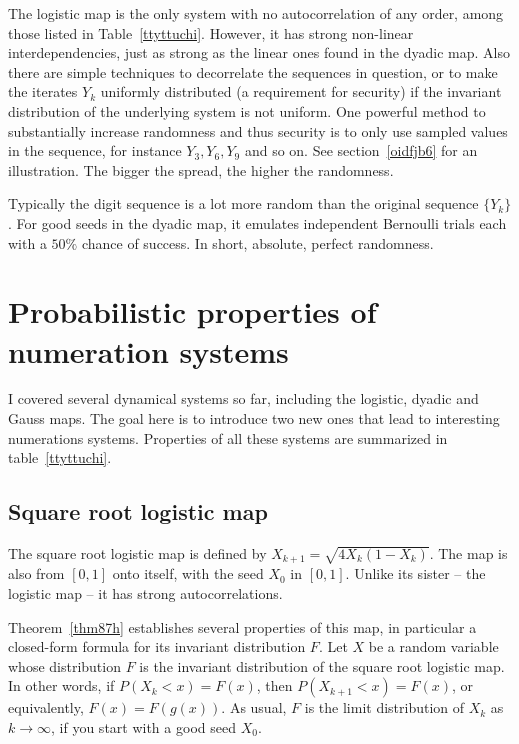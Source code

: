 \documentclass[oneside,10pt]{book}
\begin{document}
The logistic map is the only system with no autocorrelation of any order,  among those listed in Table~\ref{ttyttuchi}. However,
  it has strong non-linear interdependencies, just as strong as the linear ones found in the dyadic map. Also there are simple techniques
 to decorrelate the sequences in question, or to make the iterates $Y_k$ uniformly distributed (a requirement for security) if the invariant
 distribution of the underlying system is not uniform. One powerful method to substantially increase randomness and thus security 
 is to only use sampled values in the sequence, for instance $Y_3, Y_6, Y_9$ and so on. See section~\ref{oidfjb6} for an illustration. The bigger the spread, 
  the higher the randomness. 

Typically the digit sequence is a lot more random than the original sequence $\{Y_k\}$. For good seeds in the dyadic map, 
 it emulates independent Bernoulli trials each with a $50\%$ chance of success. In short, absolute, perfect randomness. 

 



\section{Probabilistic properties of numeration systems}

I covered several dynamical systems so far, including the logistic, dyadic and Gauss maps. The goal here is to introduce two new ones that lead
 to interesting numerations systems. Properties of all these systems are summarized in table~\ref{ttyttuchi}. 


\subsection{Square root logistic map}

The square root logistic map is defined by $X_{k+1}=\sqrt{4X_k(1-X_k)}$. 
The map is also from $[0, 1]$ onto itself, with the seed $X_0$ in $[0, 1]$. Unlike its sister -- the logistic map -- it has strong
 autocorrelations.  

Theorem~\ref{thm87h} establishes several properties of this map, in particular a closed-form formula for its invariant distribution $F$. Let $X$ be a random variable whose distribution $F$ is the invariant distribution of the square root logistic map. In other words,
 if $P(X_k<x) = F(x)$, then $P(X_{k+1}<x)=F(x)$, or equivalently, $F(x)=F(g(x))$. As usual, $F$ is the limit distribution
 of $X_k$ as $k\rightarrow\infty$, if you start with a \textcolor{index}{good seed} $X_0$.
\end{document}
